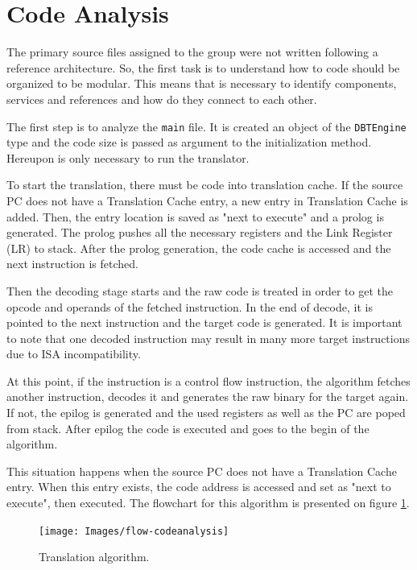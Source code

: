 \documentclass[11pt]{report}
\begin{document}
	\section{Code Analysis}
	
	\par The primary source files assigned to the group were not written following a reference architecture. So, the first task is to understand how to code should be organized to be modular. This means that is necessary to identify components, services and references and how do they connect to each other.
	\par The first step is to analyze the \texttt{main} file. It is created an object of the \texttt{DBTEngine} type and the code size is passed as argument to the initialization method. Hereupon is only necessary to run the translator.
	\par To start the translation, there must be code into translation cache. If the source PC does not have a Translation Cache entry, a new entry in Translation Cache is added. Then, the entry location is saved as "next to execute" and a prolog is generated. The prolog pushes all the necessary registers and the Link Register (LR) to stack. After the prolog generation, the code cache is accessed and the next instruction is fetched. 
	\par Then the decoding stage starts and the raw code is treated in order to get the opcode and operands of the fetched instruction. In the end of decode, it is pointed to the next instruction and the target code is generated. It is important to note that one decoded instruction may result in many more target instructions due to ISA incompatibility. 
	\par At this point, if the instruction is a control flow instruction, the algorithm fetches another instruction, decodes it and generates the raw binary for the target again. If not, the epilog is generated and the used registers as well as the PC are poped from stack. After epilog the code is executed and goes to the begin of the algorithm.
	\par This situation happens when the source PC does not have a Translation Cache entry. When this entry exists, the code address is accessed and set as "next to execute", then executed. The flowchart for this algorithm is presented on figure \ref{fig:flowchart-codeanalysis}.
	
	\begin{figure} [H]
		\centering
		\texttt{[image: Images/flow-codeanalysis]}
		\caption{Translation algorithm.}
		\label{fig:flowchart-codeanalysis}
	\end{figure}	
	
\end{document}
